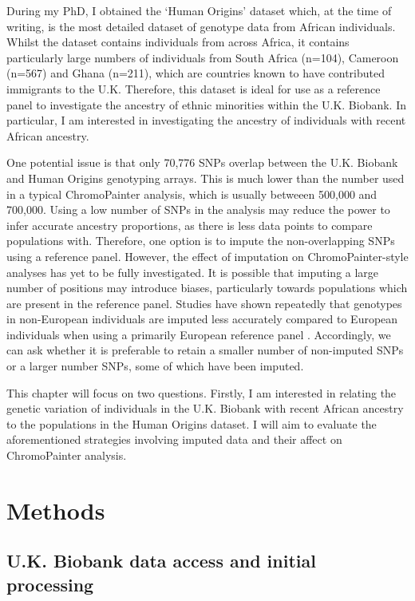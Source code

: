 During my PhD, I obtained the `Human Origins' dataset which, at the time of writing, is the most detailed dataset of genotype data from African individuals. Whilst the dataset contains individuals from across Africa, it contains particularly large numbers of individuals from South Africa (n=104), Cameroon (n=567) and Ghana (n=211), which are countries known to have contributed immigrants to the U.K. Therefore, this dataset is ideal for use as a reference panel to investigate the ancestry of ethnic minorities within the U.K. Biobank. In particular, I am interested in investigating the ancestry of individuals with recent African ancestry. 

One potential issue is that only 70,776 SNPs overlap between the U.K. Biobank and Human Origins genotyping arrays. This is much lower than the number used in a typical ChromoPainter analysis, which is usually betweeen 500,000 and 700,000. Using a low number of SNPs in the analysis may reduce the power to infer accurate ancestry proportions, as there is less data points to compare populations with. Therefore, one option is to impute the non-overlapping SNPs using a reference panel. However, the effect of imputation on ChromoPainter-style analyses has yet to be fully investigated. It is possible that imputing a large number of positions may introduce biases, particularly towards populations which are present in the reference panel. Studies have shown repeatedly that genotypes in non-European individuals are imputed less accurately compared to European individuals when using a primarily European reference panel \cite{delaneau2018integrative, taliun2021sequencing}. Accordingly, we can ask whether it is preferable to retain a smaller number of non-imputed SNPs or a larger number SNPs, some of which have been imputed. 

This chapter will focus on two questions. Firstly, I am interested in relating the genetic variation of individuals in the U.K. Biobank with recent African ancestry to the populations in the Human Origins dataset. I will aim to evaluate the aforementioned strategies involving imputed data and their affect on ChromoPainter analysis. 


\section{Methods}

\subsection{U.K. Biobank data access and initial processing}

